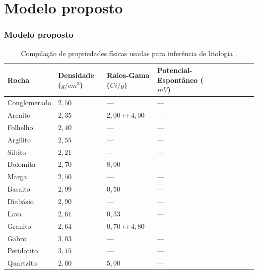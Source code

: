 \documentclass[10pt]{beamer} %
\begin{document}

\section{Modelo proposto}

\begin{frame}
	\frametitle{Modelo proposto}
 \begin{scriptsize}
	\begin{table}[H]
		\centering
		\caption{Compilação de propriedades físicas usadas para inferência de litologia \citep{Telford_1993}.}
		\label{rock-properties1}
			\begin{tabular}{@{}llllllllll@{}}
				\toprule
				Rocha         & Densidade ($g/cm^{3}$) & Raios-Gama ($Ci/g$)& Potencial-Espontâneo ($mV$)&   \\ \midrule
				Conglomerado &     $2,50$  &       ---        &    ---        &      \\
				Arenito  &    $2,35$      &       $2,00\leftrightarrow4,00$       &     ---       &      \\
				Folhelho &   $2,40$       &      ---        &      ---      &    \\
				Argilito &     $2,55$   &          ---     &       ---     &     \\
				Siltito  &      $2,21$    &          ---     &       ---     &   \\
				Dolomita &     $2,70$    &        $8,00$       &   ---         &       \\
				Marga  &    $2,50$     &         ---      &    ---        &     \\
				Basalto  &     $2,99$    &          $0,50$     &    ---       &      \\
				Diabásio &    $2,90$    &         ---      &       ---     &     \\
				Lava &     $2,61$    &      $0,33$         &      ---      &      \\
				Granito &    $2,64$      &       $0,70\leftrightarrow4,80$        &      ---      &      \\
				Gabro &    $3,03$     &       ---        &     ---       &       \\
				Peridotito &   $3,15$    &      ---         &     ---       &      \\
				Quartzito &    $2,60$    &        $5,00$      &     ---       &    \\

\end{tabular}
\end{table}
\end{scriptsize}
\end{frame}
\end{document}
